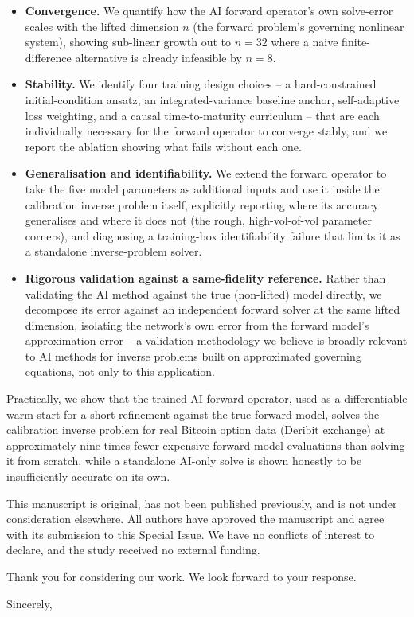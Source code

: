 \documentclass[12pt]{letter}
\begin{document}
\begin{letter}
\begin{itemize}
\item \textbf{Convergence.} We quantify how the AI forward operator's own
solve-error scales with the lifted dimension $n$ (the forward problem's
governing nonlinear system), showing sub-linear growth out to $n=32$ where a
naive finite-difference alternative is already infeasible by $n=8$.
\item \textbf{Stability.} We identify four training design choices --
a hard-constrained initial-condition ansatz, an integrated-variance baseline
anchor, self-adaptive loss weighting, and a causal time-to-maturity curriculum
-- that are each individually necessary for the forward operator to converge
stably, and we report the ablation showing what fails without each one.
\item \textbf{Generalisation and identifiability.} We extend the forward
operator to take the five model parameters as additional inputs and use it
inside the calibration inverse problem itself, explicitly reporting where its
accuracy generalises and where it does not (the rough, high-vol-of-vol
parameter corners), and diagnosing a training-box identifiability failure that
limits it as a standalone inverse-problem solver.
\item \textbf{Rigorous validation against a same-fidelity reference.} Rather
than validating the AI method against the true (non-lifted) model directly, we
decompose its error against an independent forward solver at the same lifted
dimension, isolating the network's own error from the forward model's
approximation error -- a validation methodology we believe is broadly relevant
to AI methods for inverse problems built on approximated governing equations,
not only to this application.
\end{itemize}

Practically, we show that the trained AI forward operator, used as a
differentiable warm start for a short refinement against the true forward
model, solves the calibration inverse problem for real Bitcoin option data
(Deribit exchange) at approximately nine times fewer expensive forward-model
evaluations than solving it from scratch, while a standalone AI-only solve is
shown honestly to be insufficiently accurate on its own.

This manuscript is original, has not been published previously, and is not
under consideration elsewhere. All authors have approved the manuscript and
agree with its submission to this Special Issue. We have no conflicts of
interest to declare, and the study received no external funding.

Thank you for considering our work. We look forward to your response.

\closing{Sincerely,}

\end{letter}
\end{document}
